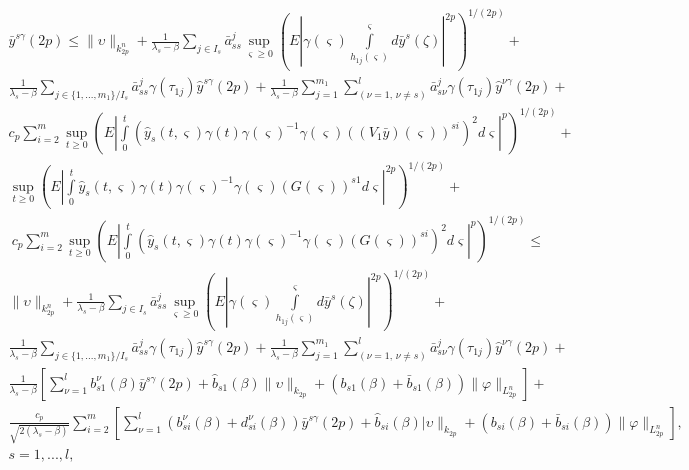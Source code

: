 \begin{equation}
    \label{eq:kri-16}
    \begin{array}{crl}
    \bar y^{s\gamma}(2p) \leq  \|\upsilon\|_{k^n_{2p}} +
    \frac{1}{\lambda _s - \beta} \sum \limits_{j \in I_s} \bar
    a^{j}_{ss}
     \mathrel {\mathop {\sup}
    \limits _{\varsigma \geq 0}} \left (E\left |\gamma (\varsigma )\int
    \limits_{h_{1j}(\varsigma)}^\varsigma
    d\bar y^s(\zeta )\right |^{2p}\right )^{1/(2p)}   +  \\
    \frac{1}{\lambda _s - \beta}\sum \limits_{j \in\{1,...,m_1\} / I_s}
    \bar a^{j}_{ss} \gamma (\tau _{1j})\hat y^{s\gamma}(2p)+
    \frac{1}{\lambda _s -
    \beta}\sum\limits_{j=1}^{m_1}\sum\limits_{(\nu=1,\, \nu \neq s )}^l
    \bar a^{j}_{s\nu}\gamma (\tau _{1j})\hat y^{\nu\gamma}(2p)
    +\\
    c_p\sum \limits_{i=2}^{m}\mathrel {\mathop {\sup}\limits _{t\geq 0}}
    \left (E \left |\int \limits _0^t (\hat y_s(t,\varsigma)\gamma
    (t)\gamma (\varsigma )^{-1}\gamma (\varsigma)((V_1\bar
    y)(\varsigma))^{si})^2d \varsigma \right
    |^{p}\right )^{1/(2p)}  + \\
    \mathrel {\mathop {\sup} \limits _{t \geq 0}} \left (E\left |\int
    \limits _0^t \hat y_s(t,\varsigma)\gamma (t)\gamma (\varsigma
    )^{-1}\gamma
    (\varsigma)(G(\varsigma))^{s1}d\varsigma \right |^{2p}\right )^{1/(2p)} + \\
    \ c_p\sum \limits_{i=2}^{m}\mathrel {\mathop {\sup}\limits _{t \geq
    0}} \left (E \left |\int \limits _0^t (\hat y_s(t,\varsigma)\gamma
    (t)\gamma (\varsigma )^{-1}\gamma (\varsigma)(G(\varsigma))^{si})^2d
    \varsigma
    \right |^{p}\right )^{1/(2p)}   \leq  \\
    \|\upsilon \|_{k^n_{2p}} + \frac{1}{\lambda _s - \beta} \sum
    \limits_{j \in I_s} \bar a^{j}_{ss}
     \mathrel {\mathop {\sup}
    \limits _{\varsigma \geq 0}} \left (E\left |\gamma (\varsigma )\int
    \limits_{h_{1j}(\varsigma)}^\varsigma
    d\bar y^s(\zeta )\right |^{2p}\right )^{1/(2p)}   +  \\
    \frac{1}{\lambda _s - \beta}\sum \limits_{j \in\{1,...,m_1\} / I_s}
    \bar a^{j}_{ss} \gamma (\tau _{1j})\hat y^{s\gamma}(2p)+
    \frac{1}{\lambda _s - \beta}\sum\limits_{j=1}^{m_1}\sum\limits_{(\nu
    =1,\, \nu \neq s )}^l \bar a^{j}_{s\nu}\gamma (\tau _{1j})\hat
    y^{\nu\gamma}(2p)
    +\\
    \frac{1}{\lambda _s -\beta } \left [\sum\limits_{\nu =1}^{l} b^\nu
    _{s1}(\beta)\bar y^{s\gamma}(2p) +
     \hat b_{s1}(\beta)
    \|\upsilon\|_{k_{2p}} +( b_{s1}(\beta) +\bar b_{s1}(\beta)
    )\|\varphi \|_{L^n_{2p}}\right ]
    +\\
    \frac{c_p}{\sqrt{2(\lambda _s -\beta )}} \sum \limits_{i=2}^{m}
    \left [\sum \limits_{\nu=1}^{l}(b^\nu_{si}(\beta) +
    d^\nu_{si}(\beta))\bar y^{s\gamma}(2p) + \hat b_{si}(\beta)
    |\upsilon\|_{k_{2p}} +( b_{si}(\beta) +\bar b_{si}(\beta ))\|\varphi
    \|_{L^n_{2p}}\right ],
    \\
    s = 1, ... , l,
    \end{array}
\end{equation}
